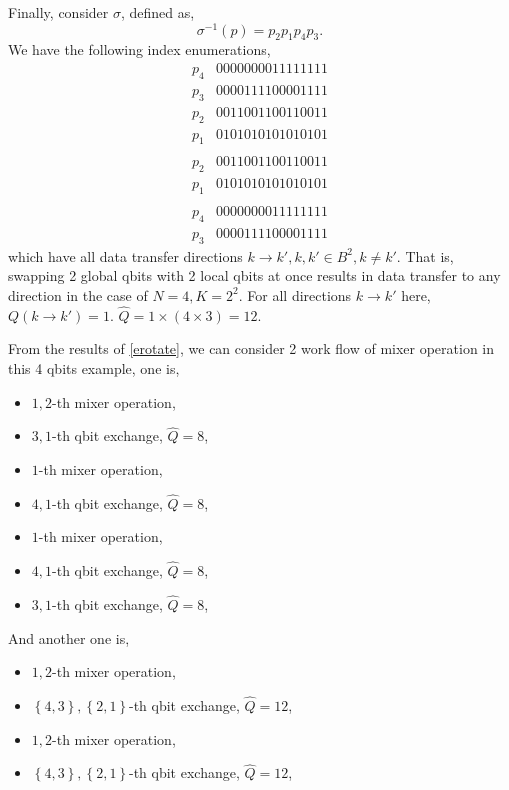 \documentclass[a4paper]{article}
\newcommand{\cbr}[1]{\left\{#1\right\}}
\begin{document}
Finally, consider \(\sigma\), defined as,
\begin{equation}
    \label{es43}
\sigma^{-1}(p) = p_2 p_1 p_4 p_3.
\end{equation}
We have the following index enumerations,
\[
\begin{matrix}
    p_4& 0000000011111111\\
    p_3& 0000111100001111\\
    p_2& 0011001100110011\\
    p_1& 0101010101010101\\
    \\
    p_2&0011001100110011\\
    p_1&0101010101010101\\
    \\
    p_4&0000000011111111\\
    p_3&0000111100001111
\end{matrix}
\]
which have all data transfer directions \(k\to k', k, k'\in B^2, k\neq k'\). That is, swapping 2 global qbits with 2 local qbits at once results in data transfer to any direction in the case of \(N=4, K=2^2\). For all directions \(k\to k'\) here, \(Q(k\to k') = 1\). \(\hat{Q} = 1\times (4\times 3) = 12\).

From the results of \eqref{erotate}, we can consider 2 work flow of mixer operation in this 4 qbits example, one is,
\begin{itemize}
    \item \(1, 2\)-th mixer operation,
    \item \(3, 1\)-th qbit exchange, \(\hat{Q} = 8\),
    \item \(1\)-th mixer operation,
    \item \(4, 1\)-th qbit exchange, \(\hat{Q} = 8\),
    \item \(1\)-th mixer operation,
    \item \(4, 1\)-th qbit exchange, \(\hat{Q} = 8\),
    \item \(3, 1\)-th qbit exchange, \(\hat{Q} = 8\),
\end{itemize}
And another one is, 
\begin{itemize}
    \item \(1, 2\)-th mixer operation,
    \item \(\cbr{4, 3}, \cbr{2, 1}\)-th qbit exchange, \(\hat{Q} = 12\),
    \item \(1, 2\)-th mixer operation,
    \item \(\cbr{4, 3}, \cbr{2, 1}\)-th qbit exchange, \(\hat{Q} = 12\),
\end{itemize}
\end{document}
